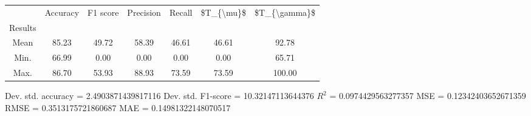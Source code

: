 \begin{tabular}{|c|c|c|c|c|c|c|}
\toprule
{} &  Accuracy &  F1 score &  Precision &  Recall &  \$T\_\{\textbackslash mu\}\$ &  \$T\_\{\textbackslash gamma\}\$ \\
Results &           &           &            &         &            &               \\
\hline
Mean    &     85.23 &     49.72 &      58.39 &   46.61 &      46.61 &         92.78 \\
Min.    &     66.99 &      0.00 &       0.00 &    0.00 &       0.00 &         65.71 \\
Max.    &     86.70 &     53.93 &      88.93 &   73.59 &      73.59 &        100.00 \\
\bottomrule
\end{tabular}

 Dev. std. accuracy = 2.4903871439817116
 Dev. std. F1-score = 10.32147113644376
 $R^2$ = 0.0974429563277357
 MSE = 0.12342403652671359
 RMSE = 0.3513175721860687
 MAE = 0.14981322148070517
